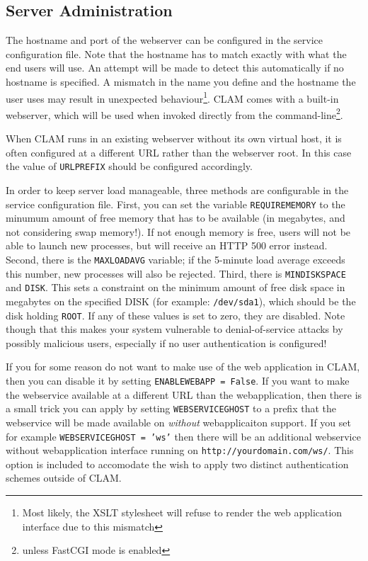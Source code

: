 \documentclass[a4paper,12pt]{report}
\begin{document}
\subsection{Server Administration}
\label{sec:sadmin}

The hostname and port of the webserver can be configured in the service configuration file. Note that the hostname has to match exactly with what the end users will use. An attempt will be made to detect this automatically if no hostname is specified. A mismatch in the name you define and the hostname the user uses may result in unexpected behaviour\footnote{Most likely, the XSLT stylesheet will refuse to render the web application interface due to this mismatch}. CLAM comes with a built-in webserver, which will be used when invoked directly from the command-line\footnote{unless FastCGI mode is enabled}.

When CLAM runs in an existing webserver without its own virtual host, it is often configured at a different URL rather than the webserver root. In this case the value of \texttt{URLPREFIX} should be configured accordingly.

In order to keep server load manageable, three methods are configurable in the service configuration file. First, you can set the variable \texttt{REQUIREMEMORY} to the minumum amount of free memory that has to be available (in megabytes, and not considering swap memory!). If not enough memory is free, users will not be able to launch new processes, but will receive an HTTP 500 error instead. Second, there is the \texttt{MAXLOADAVG} variable; if the 5-minute load average exceeds this number, new processes will also be rejected. Third, there is \texttt{MINDISKSPACE} and \texttt{DISK}. This sets a constraint on the minimum amount of free disk space in megabytes on the specified DISK (for example: \texttt{/dev/sda1}), which should be the disk holding \texttt{ROOT}. If any of these values is set to zero, they are disabled. Note though that this makes your system vulnerable to denial-of-service attacks by possibly malicious users, especially if no user authentication is configured!

If you for some reason do not want to make use of the web application in CLAM, then you can disable it by setting \texttt{ENABLEWEBAPP = False}. If you want to make the webservice available at a different URL than the webapplication, then there is a small trick you can apply by setting \texttt{WEBSERVICEGHOST} to a prefix that the webservice will be made available on \emph{without} webapplicaiton support. If you set for example \texttt{WEBSERVICEGHOST = 'ws'} then there will be an additional webservice without webapplication interface running on \texttt{http://yourdomain.com/ws/}. This option is included to accomodate the wish to apply two distinct authentication schemes outside of CLAM. 
\end{document}
